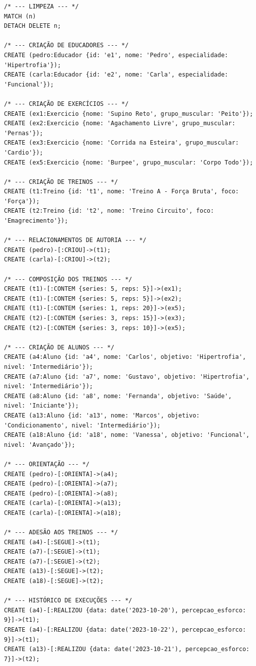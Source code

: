 \documentclass[12pt,a4paper]{article}
\begin{document}
\lstset{language=SQL, caption=Script de População (Seed)}
\begin{lstlisting}
/* --- LIMPEZA --- */
MATCH (n)
DETACH DELETE n;

/* --- CRIAÇÃO DE EDUCADORES --- */
CREATE (pedro:Educador {id: 'e1', nome: 'Pedro', especialidade: 'Hipertrofia'});
CREATE (carla:Educador {id: 'e2', nome: 'Carla', especialidade: 'Funcional'});

/* --- CRIAÇÃO DE EXERCÍCIOS --- */
CREATE (ex1:Exercicio {nome: 'Supino Reto', grupo_muscular: 'Peito'});
CREATE (ex2:Exercicio {nome: 'Agachamento Livre', grupo_muscular: 'Pernas'});
CREATE (ex3:Exercicio {nome: 'Corrida na Esteira', grupo_muscular: 'Cardio'});
CREATE (ex5:Exercicio {nome: 'Burpee', grupo_muscular: 'Corpo Todo'});

/* --- CRIAÇÃO DE TREINOS --- */
CREATE (t1:Treino {id: 't1', nome: 'Treino A - Força Bruta', foco: 'Força'});
CREATE (t2:Treino {id: 't2', nome: 'Treino Circuito', foco: 'Emagrecimento'});

/* --- RELACIONAMENTOS DE AUTORIA --- */
CREATE (pedro)-[:CRIOU]->(t1);
CREATE (carla)-[:CRIOU]->(t2);

/* --- COMPOSIÇÃO DOS TREINOS --- */
CREATE (t1)-[:CONTEM {series: 5, reps: 5}]->(ex1);
CREATE (t1)-[:CONTEM {series: 5, reps: 5}]->(ex2);
CREATE (t1)-[:CONTEM {series: 1, reps: 20}]->(ex5);
CREATE (t2)-[:CONTEM {series: 3, reps: 15}]->(ex3);
CREATE (t2)-[:CONTEM {series: 3, reps: 10}]->(ex5);

/* --- CRIAÇÃO DE ALUNOS --- */
CREATE (a4:Aluno {id: 'a4', nome: 'Carlos', objetivo: 'Hipertrofia', nivel: 'Intermediário'});
CREATE (a7:Aluno {id: 'a7', nome: 'Gustavo', objetivo: 'Hipertrofia', nivel: 'Intermediário'});
CREATE (a8:Aluno {id: 'a8', nome: 'Fernanda', objetivo: 'Saúde', nivel: 'Iniciante'});
CREATE (a13:Aluno {id: 'a13', nome: 'Marcos', objetivo: 'Condicionamento', nivel: 'Intermediário'});
CREATE (a18:Aluno {id: 'a18', nome: 'Vanessa', objetivo: 'Funcional', nivel: 'Avançado'});

/* --- ORIENTAÇÃO --- */
CREATE (pedro)-[:ORIENTA]->(a4);
CREATE (pedro)-[:ORIENTA]->(a7);
CREATE (pedro)-[:ORIENTA]->(a8);
CREATE (carla)-[:ORIENTA]->(a13);
CREATE (carla)-[:ORIENTA]->(a18);

/* --- ADESÃO AOS TREINOS --- */
CREATE (a4)-[:SEGUE]->(t1);
CREATE (a7)-[:SEGUE]->(t1);
CREATE (a7)-[:SEGUE]->(t2);
CREATE (a13)-[:SEGUE]->(t2);
CREATE (a18)-[:SEGUE]->(t2);

/* --- HISTÓRICO DE EXECUÇÕES --- */
CREATE (a4)-[:REALIZOU {data: date('2023-10-20'), percepcao_esforco: 9}]->(t1);
CREATE (a4)-[:REALIZOU {data: date('2023-10-22'), percepcao_esforco: 9}]->(t1);
CREATE (a13)-[:REALIZOU {data: date('2023-10-21'), percepcao_esforco: 7}]->(t2);
\end{lstlisting}
\end{document}
